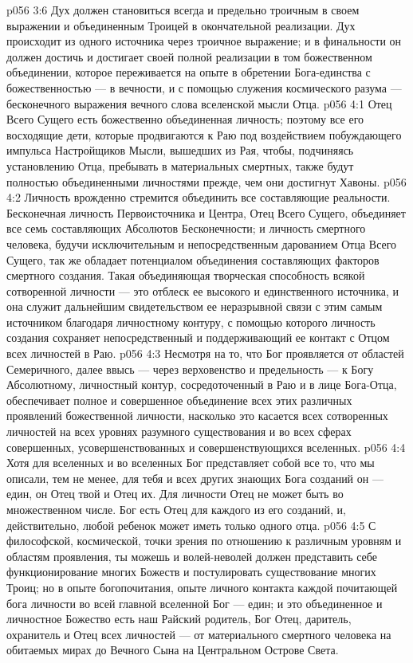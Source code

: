 \vs p056 3:6 Дух должен становиться всегда и предельно троичным в своем выражении и объединенным Троицей в окончательной реализации. Дух происходит из одного источника через троичное выражение; и в финальности он должен достичь и достигает своей полной реализации в том божественном объединении, которое переживается на опыте в обретении Бога\hyp{}единства с божественностью --- в вечности, и с помощью служения космического разума --- бесконечного выражения вечного слова вселенской мысли Отца.
\vs p056 4:1 Отец Всего Сущего есть божественно объединенная личность; поэтому все его восходящие дети, которые продвигаются к Раю под воздействием побуждающего импульса Настройщиков Мысли, вышедших из Рая, чтобы, подчиняясь установлению Отца, пребывать в материальных смертных, также будут полностью объединенными личностями прежде, чем они достигнут Хавоны.
\vs p056 4:2 Личность врожденно стремится объединить все составляющие реальности. Бесконечная личность Первоисточника и Центра, Отец Всего Сущего, объединяет все семь составляющих Абсолютов Бесконечности; и личность смертного человека, будучи исключительным и непосредственным дарованием Отца Всего Сущего, так же обладает потенциалом объединения составляющих факторов смертного создания. Такая объединяющая творческая способность всякой сотворенной личности --- это отблеск ее высокого и единственного источника, и она служит дальнейшим свидетельством ее неразрывной связи с этим самым источником благодаря личностному контуру, с помощью которого личность создания сохраняет непосредственный и поддерживающий ее контакт с Отцом всех личностей в Раю.
\vs p056 4:3 Несмотря на то, что Бог проявляется от областей Семеричного, далее ввысь --- через верховенство и предельность --- к Богу Абсолютному, личностный контур, сосредоточенный в Раю и в лице Бога\hyp{}Отца, обеспечивает полное и совершенное объединение всех этих различных проявлений божественной личности, насколько это касается всех сотворенных личностей на всех уровнях разумного существования и во всех сферах совершенных, усовершенствованных и совершенствующихся вселенных.
\vs p056 4:4 \pc Хотя для вселенных и во вселенных Бог представляет собой все то, что мы описали, тем не менее, для тебя и всех других знающих Бога созданий он --- един, он Отец твой и Отец их. Для личности Отец не может быть во множественном числе. Бог есть Отец для каждого из его созданий, и, действительно, любой ребенок может иметь только одного отца.
\vs p056 4:5 С философской, космической, точки зрения по отношению к различным уровням и областям проявления, ты можешь и волей\hyp{}неволей должен представить себе функционирование многих Божеств и постулировать существование многих Троиц; но в опыте богопочитания, опыте личного контакта каждой почитающей бога личности во всей главной вселенной Бог --- един; и это объединенное и личностное Божество есть наш Райский родитель, Бог Отец, даритель, охранитель и Отец всех личностей --- от материального смертного человека на обитаемых мирах до Вечного Сына на Центральном Острове Света.
